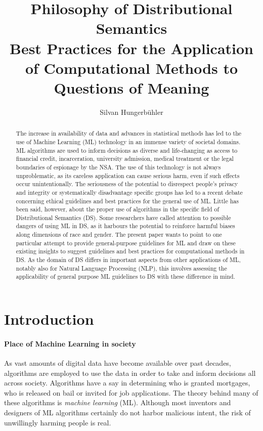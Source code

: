 \documentclass{article}
\title{Philosophy of Distributional Semantics\\
\large Best Practices for the Application of Computational Methods to Questions of Meaning}
\date{}
\author{Silvan Hungerb{\"u}hler}
\begin{document}
\maketitle
\begin{abstract}
The increase in availability of data and advances in statistical methods has led to the use of Machine Learning (ML) technology in an immense variety of societal domains. ML algorithms are used to inform decisions as diverse and life-changing as access to financial credit, incarceration, university admission, medical treatment or the legal boundaries of espionage by the NSA.
The use of this technology is not always unproblematic, as its careless application can cause serious harm, even if such effects occur unintentionally.
The seriousness of the potential to disrespect people's privacy and integrity or systematically disadvantage specific groups has led to a recent debate concerning ethical guidelines and best practices for the general use of ML.
Little has been said, however, about the proper use of algorithms in the specific field of Distributional Semantics (DS). Some researchers have called attention to possible dangers of using ML in DS, as it harbours the potential to reinforce harmful biases along dimensions of race and gender.
The present paper wants to point to one particular attempt to provide general-purpose guidelines for ML and draw on these existing insights to suggest guidelines and best practices for computational methods in DS.
As the domain of DS differs in important aspects from other applications of ML, notably also for Natural Language Processing (NLP),
this involves assessing  the applicability of general purpose ML guidelines to DS with these difference in mind.
\end{abstract}
\section{Introduction}
\paragraph{Place of Machine Learning in society}
As vast amounts of digital data have become available over past decades, algorithms are employed to use the data in order to take and inform decisions all across society. 
Algorithms have a say in determining who is granted mortgages, who is released on bail or invited for job applications. 
\cite{algorithms2016}
The theory behind many of these algorithms is \emph{machine learning} (ML).
Although most inventors and designers of ML algorithms certainly do not harbor malicious intent, the risk of unwillingly harming people is real.
\end{document}
